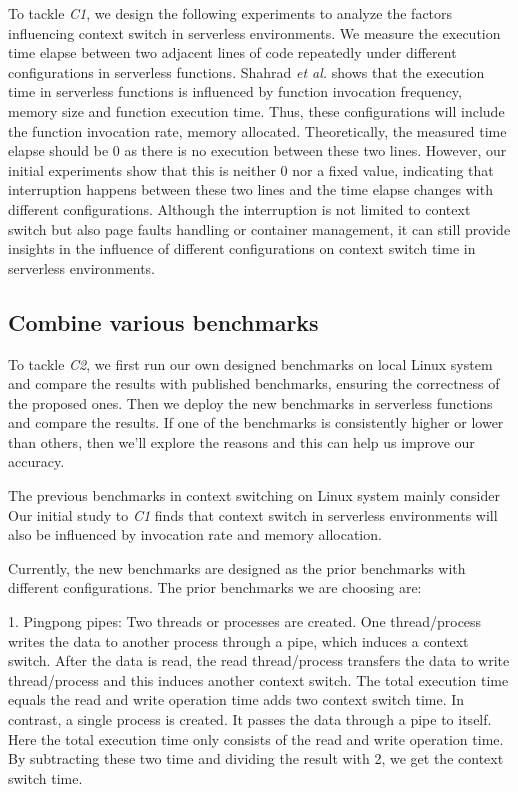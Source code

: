 	To tackle \emph{C1}, we design the following experiments to analyze the factors influencing context switch in serverless environments.
	We measure the execution time elapse between two adjacent lines of code repeatedly under different configurations in serverless functions.
	Shahrad \emph{et al.} \cite{serverless-main} shows that the execution time in serverless functions is influenced by function invocation frequency, memory size and function execution time.
	Thus, these configurations will include the function invocation rate, memory allocated.
	Theoretically, the measured time elapse should be 0 as there is no execution between these two lines. 
	However, our initial experiments show that this is neither 0 nor a fixed value, indicating that interruption happens between these two lines
	and the time elapse changes with different configurations. 
	Although the interruption is not limited to context switch but also page faults handling or container management, 
	it can still provide insights in the influence of different configurations on context switch time in serverless environments.


\subsection{Combine various benchmarks}
	To tackle \emph{C2}, we first run our own designed benchmarks on local Linux system and compare the results with published benchmarks\cite{cs-lmbench,cs-pipes,cs-arm,cs-web},
	 ensuring the correctness of the proposed ones. Then we deploy the new benchmarks in serverless functions and compare the results. 
	 If one of the benchmarks is consistently higher or lower than others, then we'll explore the reasons and this can help us improve our accuracy.

	The previous benchmarks in context switching on Linux system mainly consider %
	Our initial study to \emph{C1} finds that context switch in serverless environments will also be influenced by invocation rate and memory allocation.   

	Currently, the new benchmarks are designed as the prior benchmarks with different configurations.
	The prior benchmarks we are choosing are:
	
	1. Pingpong pipes\cite{cs-pipes,cs-web}: Two threads or processes are created. 
		      One thread/process writes the data to another process through a pipe, which induces a context switch. 
			  After the data is read, the read thread/process transfers the data to write thread/process and this induces another context switch.
			  The total execution time equals the read and write operation time adds two context switch time.
			  In contrast, a single process is created. It passes the data through a pipe to itself. 
			  Here the total execution time only consists of the read and write operation time.
			  By subtracting these two time and dividing the result with 2, we get the context switch time.
	
